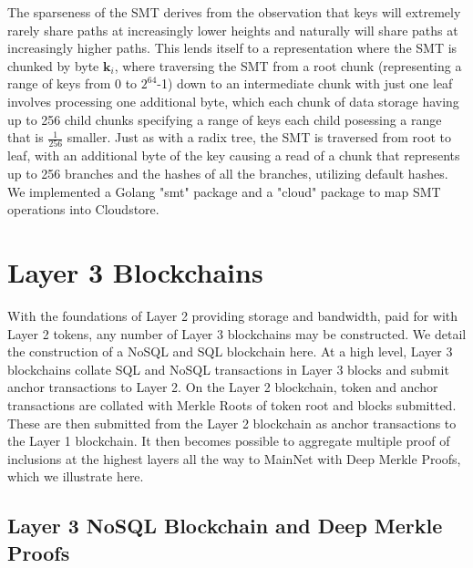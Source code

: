 \documentclass{article}
\begin{document}
The sparseness of the SMT derives from the observation that keys will extremely rarely share paths at increasingly lower heights and naturally will share paths at increasingly higher paths.  This lends itself to a representation where the SMT is chunked by byte $\mathbf{k}_i$, where traversing the SMT from a root chunk (representing a range of keys from 0 to $2^{64}$-1) down to an intermediate chunk with just one leaf involves processing one additional byte, which each chunk of data storage having up to 256 child chunks specifying a range of keys each child posessing a range that is $\frac{1}{256}$ smaller.  Just as with a radix tree, the SMT is traversed from root to leaf, with an additional byte of the key causing a read of a chunk that represents up to 256 branches and the hashes of all the branches, utilizing default hashes.  We implemented a Golang "smt" package and a "cloud" package to map SMT operations into Cloudstore.

\section{Layer 3 Blockchains\label{sec:layer3}}

With the foundations of Layer 2 providing storage and bandwidth, paid for with Layer 2 tokens, any number of Layer 3 blockchains may be constructed.  We detail the construction of a NoSQL and SQL blockchain here.  At a high level, Layer 3 blockchains collate SQL and NoSQL transactions in Layer 3 blocks and submit anchor transactions to Layer 2. On the Layer 2 blockchain, token and anchor transactions are collated with Merkle Roots of token root and blocks submitted.  These are then submitted from the Layer 2 blockchain as anchor transactions to the Layer 1 blockchain.  It then becomes possible to aggregate multiple proof of inclusions at the highest layers all the way to MainNet with Deep Merkle Proofs, which we illustrate here.

\subsection{Layer 3 NoSQL Blockchain and Deep Merkle Proofs}
\end{document}
